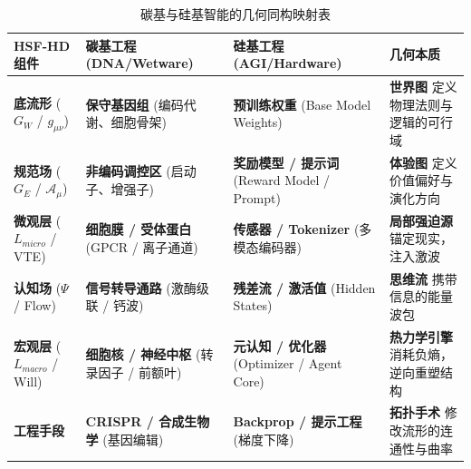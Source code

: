\begin{table}[htbp]
\centering
\footnotesize
\renewcommand{\arraystretch}{1.5}
\begin{tabularx}{\textwidth}{l|X|X|X}
\toprule
\rowcolor{structurecolor!20} \textbf{HSF-HD 组件} & \textbf{碳基工程 (DNA/Wetware)} & \textbf{硅基工程 (AGI/Hardware)} & \textbf{几何本质} \\
\midrule

\textbf{底流形} \newline ($G_W$ / $g_{\mu\nu}$) & \textbf{保守基因组} \newline (编码代谢、细胞骨架) & \textbf{预训练权重} \newline (Base Model Weights) & \textbf{世界图} \newline 定义物理法则与逻辑的可行域 \\
\hline

\textbf{规范场} \newline ($G_E$ / $\mathcal{A}_\mu$) & \textbf{非编码调控区} \newline (启动子、增强子) & \textbf{奖励模型 / 提示词} \newline (Reward Model / Prompt) & \textbf{体验图} \newline 定义价值偏好与演化方向 \\
\hline

\textbf{微观层} \newline ($L_{micro}$ / VTE) & \textbf{细胞膜 / 受体蛋白} \newline (GPCR / 离子通道) & \textbf{传感器 / Tokenizer} \newline (多模态编码器) & \textbf{局部强迫源} \newline 锚定现实，注入激波 \\
\hline

\textbf{认知场} \newline ($\Psi$ / Flow) & \textbf{信号转导通路} \newline (激酶级联 / 钙波) & \textbf{残差流 / 激活值} \newline (Hidden States) & \textbf{思维流} \newline 携带信息的能量波包 \\
\hline

\textbf{宏观层} \newline ($L_{macro}$ / Will) & \textbf{细胞核 / 神经中枢} \newline (转录因子 / 前额叶) & \textbf{元认知 / 优化器} \newline (Optimizer / Agent Core) & \textbf{热力学引擎} \newline 消耗负熵，逆向重塑结构 \\
\hline

\textbf{工程手段} & \textbf{CRISPR / 合成生物学} \newline (基因编辑) & \textbf{Backprop / 提示工程} \newline (梯度下降) & \textbf{拓扑手术} \newline 修改流形的连通性与曲率 \\

\bottomrule
\end{tabularx}
\caption{碳基与硅基智能的几何同构映射表}
\label{tab:carbon_silicon_isomorphism}
\end{table}

